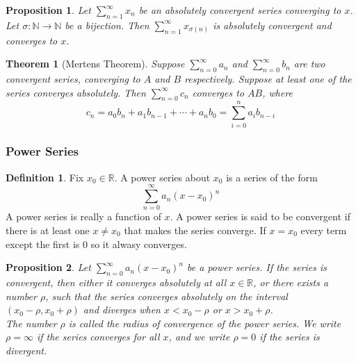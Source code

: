 \documentclass{article}
\newtheorem{theorem}{Theorem}[section]
\newtheorem{proposition}{Proposition}[section]
\theoremstyle{definition}
\newtheorem{definition}{Definition}[section]
\theoremstyle{remark}
\begin{document}
\begin{proposition}
Let $\sum^\infty_{n=1}{x_n}$ be an absolutely convergent series converging to $x$. 
Let $\sigma: \mathbb{N}\to \mathbb{N}$ be a bijection. Then 
$\sum^\infty_{n=1}{x_{\sigma(n)}}$ is absolutely convergent and converges to $x$.
\end{proposition}


\begin{theorem}[Mertens Theorem]
Suppose $\sum^\infty_{n=0}{a_n}$ and $\sum^\infty_{n=0}{b_n}$
are two convergent series, converging to $A$ and $B$ respectively. Suppose at 
least one of the series converges absolutely. Then $\sum^\infty_{n=0}{c_n}$ converges
to $AB$, where 
\[
c_n = a_0b_n + a_1b_{n-1} + \cdots + a_nb_0 = \sum^n_{i=0}{a_ib_{n-i}}
\]

\end{theorem}




\subsubsection{Power Series}

\begin{definition}
Fix $x_0 \in \mathbb{R}$. A power series about $x_0$ is a series of the form
\[
\sum_{n=0}^{\infty}{a_n(x-x_0)^n}
\]
A power series is really a function of $x$. A power
series is said to be convergent if there is at least one $x \neq x_0$ that
makes the series converge. If $x = x_0$ every term except the first is 0 so it alwasy converges. 
\end{definition}




\begin{proposition}
Let $\sum_{n=0}^{\infty} a_n (x - x_0)^n$ be a power series. 
If the series is convergent, then either it converges absolutely at all $x \in \mathbb{R}$, or there exists a 
number $\rho$, such that the series converges absolutely on the interval $(x_0 - \rho, x_0 + \rho)$ and diverges 
when $x < x_0 - \rho$ or $x > x_0 + \rho$. \\
\indent The number $\rho$ is called the \textit{radius of convergence} of the power series. We 
write $\rho = \infty$ if the series converges for all $x$, and we write $\rho = 0$ if the series is divergent. 
\end{proposition}
\end{document}
